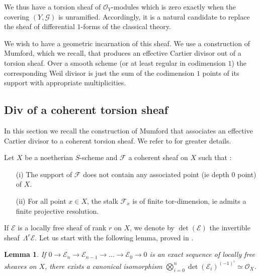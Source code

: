 \documentclass{amsart}
\newtheorem{lemm}{Lemma}[section]
\theoremstyle{definition}
\theoremstyle{remark}
\begin{document}
We thus have a torsion sheaf of ${{\mathcal O}}_Y$-modules which is zero exactly when the covering $(Y,{{\mathcal G}})$ is unramified. Accordingly, it is a natural candidate to replace the sheaf of differential $1$-forms of the classical theory.  

We wish to have a geometric incarnation of this sheaf. We use a construction of Mumford, which we recall, that produces an effective Cartier divisor out of a torsion sheaf. Over a smooth scheme (or at least regular in codimension $1$) the corresponding Weil divisor is just the sum of the codimension $1$ points of its support with appropriate multiplicities.

\subsection{Div of a coherent torsion sheaf}
\label{div}
In this section we recall the construction of Mumford that associates an effective Cartier divisor to a coherent torsion sheaf. We refer to \cite[Chap. V.3]{GIT} for greater details.

Let $X$ be a noetherian $S$-scheme and ${{\mathcal F}}$ a coherent sheaf on $X$ such that : 

\begin{itemize}

\item[(i)] The support of ${{\mathcal F}}$ does not contain any associated point (ie depth $0$ point) of $X$.

\item[(ii)] For all point $x \in X$, the stalk ${{\mathcal F}}_x$ is of finite tor-dimension, ie admits a finite projective resolution.

\end{itemize}

If ${{\mathcal E}}$ is a locally free sheaf of rank $r$ on $X$, we denote by $\det({{\mathcal E}})$ the invertible sheaf~$\Lambda^r {{\mathcal E}}$. Let us start with the following lemma, proved in \cite[Chap.V, \S 3, Lemma 5.6]{GIT}. 

\begin{lemm}
If $0 {\longrightarrow} {{\mathcal E}}_n {\longrightarrow} {{\mathcal E}}_{n-1} {\longrightarrow} ... {\longrightarrow} {{\mathcal E}}_0 {\longrightarrow} 0$ is an exact sequence of locally free sheaves on $X$, there exists a canonical isomorphism $\displaystyle\bigotimes\limits_{i=0}^n \det({{\mathcal E}}_i)^{(-1)^i} \simeq {{\mathcal O}}_X$.

\end{lemm}
\end{document}
